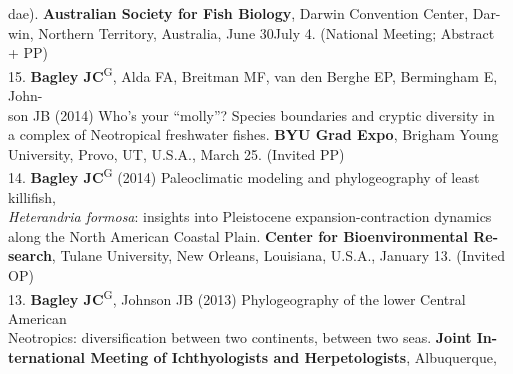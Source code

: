 \documentclass[margin,line]{res}
\begin{document}
\begin{resume}
\hspace*{8mm} dae). \textbf{Australian Society for Fish Biology}, Darwin Convention Center, Dar-\\
\hspace*{8mm} win, Northern Territory, Australia, June 30\textendash July 4. (National Meeting; Abstract \\ \vspace{2mm}
\hspace*{8mm}+ PP) \\
15. \textbf{Bagley JC}\textsuperscript{G}, Alda FA, Breitman MF, van den Berghe EP, Bermingham E, John-\\
\hspace*{8mm} son JB (2014) Who's your ``molly''?  Species boundaries and cryptic diversity in\\
\hspace*{8mm} a complex of Neotropical freshwater fishes. \textbf{BYU Grad Expo}, Brigham Young\\ \vspace{2mm}
\hspace*{8mm}University, Provo, UT, U.S.A., March 25. (Invited PP) \\
14. \textbf{Bagley JC}\textsuperscript{G} (2014) Paleoclimatic modeling and phylogeography of least killifish,\\
\hspace*{8mm} \emph{Heterandria formosa}: insights into Pleistocene expansion-contraction dynamics\\
\hspace*{8mm} along the North American Coastal Plain. \textbf{Center for Bioenvironmental Re-}\\
\hspace*{8mm} \textbf{search}, Tulane University, New Orleans, Louisiana, U.S.A., January 13. (Invited\\ \vspace{2mm}
\hspace*{8mm}OP) \\
13. \textbf{Bagley JC}\textsuperscript{G}, Johnson JB (2013) Phylogeography of the lower Central American\\
\hspace*{8mm} Neotropics: diversification between two continents, between two seas. \textbf{Joint In-}\\
\hspace*{8mm} \textbf{ternational Meeting of Ichthyologists and Herpetologists}, Albuquerque,\\ \vspace{2mm}

\end{resume}
\end{document}
